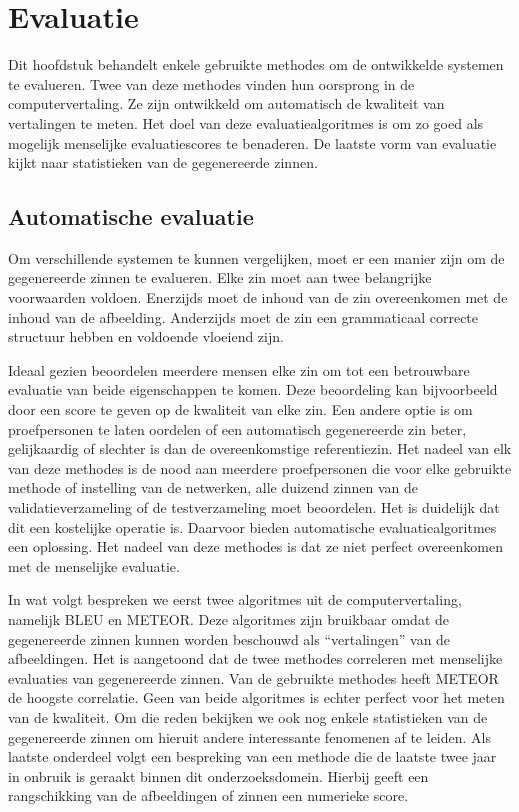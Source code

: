 \chapter{Evaluatie}
\label{hoofdstuk:evaluatie}
Dit hoofdstuk behandelt enkele gebruikte methodes om de ontwikkelde systemen te evalueren. Twee van deze methodes vinden hun oorsprong in de computervertaling. Ze zijn ontwikkeld om automatisch de kwaliteit van vertalingen te meten. Het doel van deze evaluatiealgoritmes is om zo goed als mogelijk menselijke evaluatiescores te benaderen. De laatste vorm van evaluatie kijkt naar statistieken van de gegenereerde zinnen.


\section{Automatische evaluatie}
Om verschillende systemen te kunnen vergelijken, moet er een manier zijn om de gegenereerde zinnen te evalueren. Elke zin moet aan twee belangrijke voorwaarden voldoen. Enerzijds moet de inhoud van de zin overeenkomen met de inhoud van de afbeelding. Anderzijds moet de zin een grammaticaal correcte structuur hebben en voldoende vloeiend zijn.

Ideaal gezien beoordelen meerdere mensen elke zin om tot een betrouwbare evaluatie van beide eigenschappen te komen. Deze beoordeling kan bijvoorbeeld door een score te geven op de kwaliteit van elke zin. Een andere optie is om proefpersonen te laten oordelen of een automatisch gegenereerde zin beter, gelijkaardig of slechter is dan de overeenkomstige referentiezin. Het nadeel van elk van deze methodes is de nood aan meerdere proefpersonen die voor elke gebruikte methode of instelling van de netwerken, alle duizend zinnen van de validatieverzameling of de testverzameling moet beoordelen. Het is duidelijk dat dit een kostelijke operatie is. Daarvoor bieden automatische evaluatiealgoritmes een oplossing. Het nadeel van deze methodes is dat ze niet perfect overeenkomen met de menselijke evaluatie.

In wat volgt bespreken we eerst twee algoritmes uit de computervertaling, namelijk BLEU en METEOR.  Deze algoritmes zijn bruikbaar omdat de gegenereerde zinnen kunnen worden beschouwd als ``vertalingen'' van de afbeeldingen. Het is aangetoond dat de twee methodes correleren met menselijke evaluaties van gegenereerde zinnen. Van de gebruikte methodes heeft METEOR de hoogste correlatie. 
Geen van beide algoritmes is echter perfect voor het meten van de kwaliteit.
Om die reden bekijken we ook nog enkele statistieken van de gegenereerde zinnen om hieruit andere interessante fenomenen af te leiden.
Als laatste onderdeel volgt een bespreking van een methode die de laatste twee jaar in onbruik is geraakt binnen dit onderzoeksdomein. Hierbij geeft een rangschikking van de afbeeldingen of zinnen een numerieke score.

